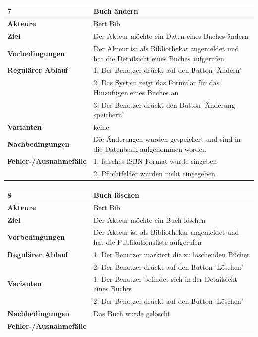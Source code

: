 \documentclass[fontsize=12pt,paper=a4,twoside]{scrartcl}
\begin{document}
\begin{table}[htbp]
\label{7}
\begin{tabular}{|l|p{10cm}|}
\hline 
\textbf{7} & \textbf{Buch ändern} \\ \hline
\textbf{Akteure} & Bert Bib\\ \hline
\textbf{Ziel} & Der Akteur möchte ein Daten eines Buches ändern \\ \hline
\textbf{Vorbedingungen} & Der Akteur ist als Bibliothekar angemeldet und hat die Detailsicht eines 
Buches aufgerufen  \\ \hline
\textbf{Regulärer Ablauf} & 
1. Der Benutzer drückt auf den Button 'Ändern' \\
&2. Das System zeigt das Formular für das Hinzufügen eines Buches an\\
&3. Der Benutzer drückt den Button 'Änderung speichern'\\
\hline
\textbf{Varianten} & 
keine \\ \hline
\textbf{Nachbedingungen} & Die Änderungen wurden gespeichert und sind in die Datenbank 
aufgenommen worden\\ \hline
\textbf{Fehler-/Ausnahmefälle} & 1. falsches ISBN-Format wurde eingeben\\
&2. Pflichtfelder wurden nicht eingegeben\\
\hline
\end{tabular}
\end{table}

\begin{table}[htbp]
\label{8}
\begin{tabular}{|l|p{10cm}|}
\hline 
\textbf{8} & \textbf{Buch löschen} \\ \hline
\textbf{Akteure} & Bert Bib\\ \hline
\textbf{Ziel} & Der Akteur möchte ein Buch löschen \\ \hline
\textbf{Vorbedingungen} & Der Akteur ist als Bibliothekar angemeldet und hat die Publikationsliste 
aufgerufen  \\ \hline
\textbf{Regulärer Ablauf} & 
1. Der Benutzer markiert die zu löschenden Bücher\\
&2. Der Benutzer drückt auf den Button 'Löschen' \\
\hline
\textbf{Varianten} & 
1. Der Benutzer befindet sich in der Detailsicht eines Buches\\
&2. Der Benutzer drückt auf den Button 'Löschen' \\ \hline
\textbf{Nachbedingungen} & Das Buch wurde gelöscht \\ \hline
\textbf{Fehler-/Ausnahmefälle} & \\
\hline
\end{tabular}
\end{table}
\end{document}
